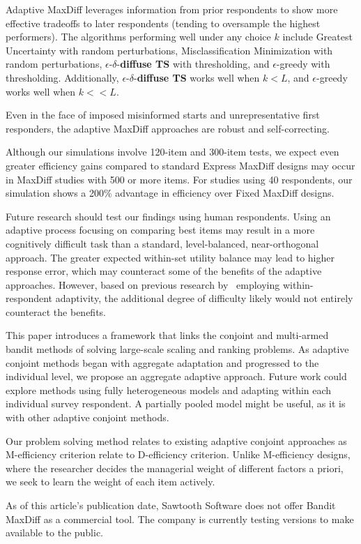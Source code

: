 \documentclass[nonblindrev]{informs3}
\newcommand{\edts}{$\epsilon$-$\delta$-\textbf{diffuse TS} }
\begin{document}
Adaptive MaxDiff leverages information from prior respondents to show more effective tradeoffs to later respondents (tending to oversample the highest performers). The algorithms performing well under any choice $k$ include Greatest Uncertainty with random perturbations, Misclassification Minimization with random perturbations, \edts with thresholding, and $\epsilon$-greedy with thresholding. Additionally, \edts works well when $k<L$, and $\epsilon$-greedy works well when $k<<L$.

Even in the face of imposed misinformed starts  and unrepresentative first responders, the adaptive MaxDiff approaches are robust and self-correcting.

Although our simulations involve 120-item and 300-item tests, we expect even greater efficiency gains compared to standard Express MaxDiff designs may occur in MaxDiff studies with 500 or more items. For studies using 40 respondents, our simulation shows a 200\% advantage in efficiency over Fixed MaxDiff designs.

Future research should test our findings using human respondents. Using an adaptive process focusing on comparing best items may result in a more cognitively difficult task than a standard, level-balanced, near-orthogonal approach.  The greater expected within-set utility balance may lead to higher response error, which may counteract some of the benefits of the adaptive approaches.  However, based on previous research by~\cite{orme2006adaptive} employing within-respondent adaptivity, the additional degree of difficulty likely would not entirely counteract the benefits.

This paper introduces a framework that links the conjoint and multi-armed bandit methods of solving large-scale scaling and ranking problems. As adaptive conjoint methods began with aggregate adaptation and progressed to the individual level, we propose an aggregate adaptive approach. Future work could explore methods using fully heterogeneous models and adapting within each individual survey respondent. A partially pooled model might be useful, as it is with other adaptive conjoint methods. 

Our problem solving method relates to existing adaptive conjoint approaches as M-efficiency criterion relate to D-efficiency criterion.  Unlike M-efficiency designs, where the researcher decides the managerial weight of different factors a priori, we seek to learn the weight of each item actively. 

As of this article's publication date, Sawtooth Software does not offer Bandit MaxDiff as a commercial tool. The company is currently testing versions to make available to the public.
\end{document}
